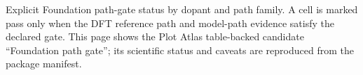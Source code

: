 Explicit Foundation path-gate status by dopant and path family. A cell is marked pass only when the DFT reference path and model-path evidence satisfy the declared gate. This page shows the Plot Atlas table-backed candidate ``Foundation path gate''; its scientific status and caveats are reproduced from the package manifest.

